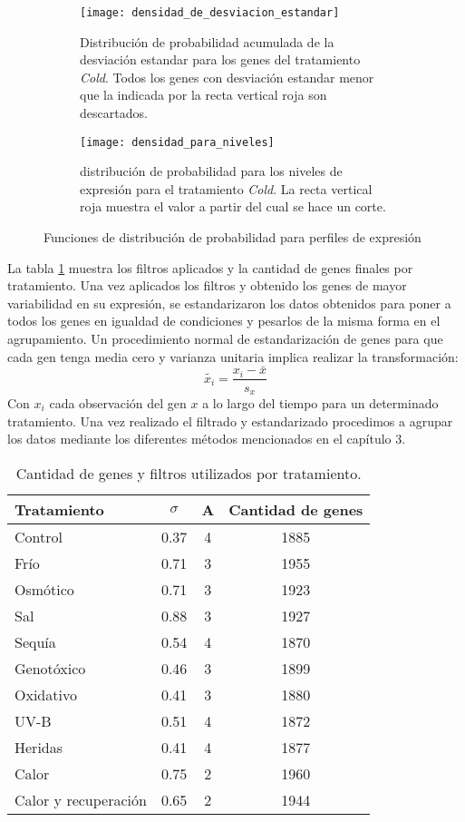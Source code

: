 \begin{figure*}[t!]
    \centering
    \begin{subfigure}[t]{0.4\textwidth}
    \centering
    \texttt{[image: densidad\_de\_desviacion\_estandar]}
    \caption{Distribución de probabilidad acumulada de la desviación estandar para los genes del tratamiento \textit{Cold}. Todos los genes con desviación estandar menor que la indicada por la recta vertical roja son descartados.}
    \label{fig:densidad_de_desviacion_estandar}
    \end{subfigure}
    \begin{subfigure}[t]{0.4\textwidth}
    \centering
    \texttt{[image: densidad\_para\_niveles]}
    \caption{distribución de probabilidad para los niveles de expresión para el tratamiento \textit{Cold}. La recta vertical roja muestra el valor a partir del cual se hace un corte.}
    \label{fig:densidad_para_niveles}
    \end{subfigure}
    \caption{Funciones de distribución de probabilidad para perfiles de expresión}
\end{figure*}
La tabla \ref{tabla:genes_por_tratamiento} muestra los filtros aplicados y la cantidad de genes finales por tratamiento.
Una vez aplicados los filtros y obtenido los genes de mayor variabilidad en su expresión, se estandarizaron los datos obtenidos para poner a todos los genes en igualdad de condiciones y pesarlos de la misma forma en el agrupamiento. Un procedimiento normal de estandarización de genes para que cada gen tenga media cero y varianza unitaria implica realizar la transformación:
\begin{equation}
	\tilde{x_i} = \frac{x_i-\bar{x}}{s_x}
\end{equation}
Con $x_i$ cada observación del gen $x$ a lo largo del tiempo para un determinado tratamiento. Una vez realizado el filtrado y estandarizado procedimos a agrupar los datos mediante los diferentes métodos mencionados en el capítulo 3.
\begin{table}[t]
  \centering
\begin{tabular}{| l | c | c | c |}
\hline
Tratamiento & $\sigma$ & A & Cantidad de genes \\
\hline
Control & 0.37 & 4 & 1885 \\
\hline
Frío & 0.71 & 3 & 1955 \\
\hline
Osmótico & 0.71 & 3 & 1923 \\
\hline
Sal & 0.88 & 3 & 1927 \\
\hline
Sequía & 0.54 & 4 & 1870 \\
\hline
Genotóxico & 0.46 & 3 & 1899 \\
\hline
Oxidativo & 0.41 & 3 & 1880 \\
\hline
UV-B & 0.51 & 4 & 1872 \\
\hline
Heridas & 0.41 & 4 & 1877 \\
\hline
Calor & 0.75 & 2 & 1960 \\
\hline
Calor y recuperación & 0.65 & 2 & 1944 \\
\hline                                         
\end{tabular}
\caption{Cantidad de genes y filtros utilizados por tratamiento.}
\label{tabla:genes_por_tratamiento}
\end{table}
